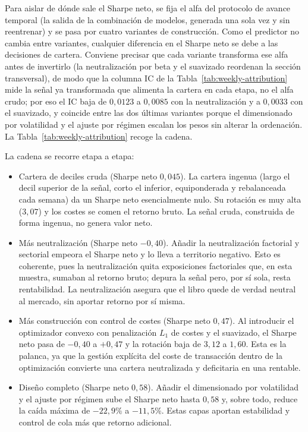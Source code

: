 Para aislar de dónde sale el Sharpe neto, se fija el alfa del protocolo de avance temporal (la salida de la combinación
de modelos, generada una sola vez y sin reentrenar) y se pasa por cuatro variantes de
construcción. Como el predictor no cambia entre variantes, cualquier diferencia en el
Sharpe neto se debe a las decisiones de cartera. Conviene precisar que cada variante
transforma ese alfa antes de invertirlo (la neutralización por beta y el suavizado
reordenan la sección transversal), de modo que la columna IC de la
Tabla~\ref{tab:weekly-attribution} mide la señal ya transformada que alimenta la cartera
en cada etapa, no el alfa crudo; por eso el IC baja de $0{,}0123$ a $0{,}0085$ con la
neutralización y a $0{,}0033$ con el suavizado, y coincide entre las dos últimas variantes
porque el dimensionado por volatilidad y el ajuste por régimen escalan los pesos sin
alterar la ordenación. La Tabla~\ref{tab:weekly-attribution} recoge la cadena.



La cadena se recorre etapa a etapa:

\begin{itemize}
  \item Cartera de deciles cruda (Sharpe neto $0{,}045$). La cartera ingenua (largo el
  decil superior de la señal, corto el inferior, equiponderada y rebalanceada cada semana)
  da un Sharpe neto esencialmente nulo. Su rotación es muy alta ($3{,}07$) y los costes se
  comen el retorno bruto. La señal cruda, construida de forma ingenua, no genera valor
  neto.
  \item Más neutralización (Sharpe neto $-0{,}40$). Añadir la neutralización factorial y
  sectorial empeora el Sharpe neto y lo lleva a territorio negativo. Esto es coherente, pues la
  neutralización quita exposiciones factoriales que, en esta muestra, sumaban al retorno
  bruto; depura la señal pero, por sí sola, resta rentabilidad. La neutralización asegura que el libro quede de verdad neutral al
  mercado, sin aportar retorno por sí misma.
  \item Más construcción con control de costes (Sharpe neto $0{,}47$). Al introducir el
  optimizador convexo con penalización $L_1$ de costes y el suavizado, el Sharpe neto pasa
  de $-0{,}40$ a $+0{,}47$ y la rotación baja de $3{,}12$ a $1{,}60$. Esta es la palanca,
  ya que la gestión explícita del coste de transacción dentro de la optimización convierte una
  cartera neutralizada y deficitaria en una rentable.
  \item Diseño completo (Sharpe neto $0{,}58$). Añadir el dimensionado por volatilidad y
  el ajuste por régimen sube el Sharpe neto hasta $0{,}58$ y, sobre todo, reduce la caída
  máxima de $-22{,}9\%$ a $-11{,}5\%$. Estas capas aportan estabilidad y control de cola
  más que retorno adicional.
\end{itemize}

